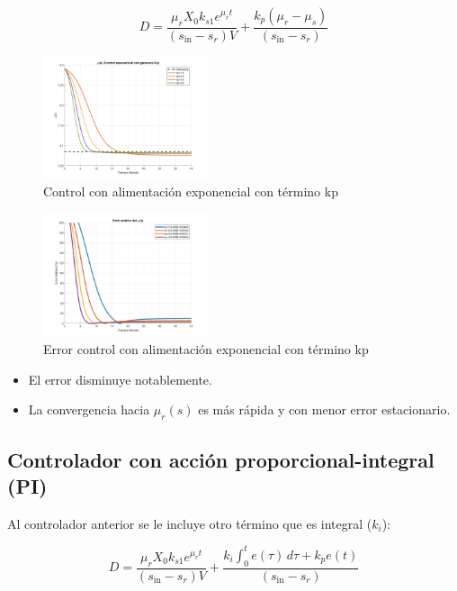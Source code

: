 \documentclass[letterpaper, 10 pt, conference]{ieeeconf}  %
\begin{document}
\begin{equation}
D = \frac{\mu_r X_0 k_{s1} e^{\mu_r t}}{(s_{\text{in}} - s_r) V} + \frac{k_p (\mu_r - \mu_s)}{(s_{\text{in}} - s_r)}
\end{equation}

\begin{figure}[H]
  \centering
  \includegraphics[width=0.43\textwidth]{./Images_tp3/exp_kp.png}
  \caption{Control con alimentación exponencial con término kp}
\end{figure}
\begin{figure}[H]
  \centering
  \includegraphics[width=0.43\textwidth]{./Images_tp3/exp_err_kp.png}
  \caption{Error control con alimentación exponencial con término kp}
\end{figure}

\begin{itemize}  
    \item El error disminuye notablemente.  
    \item La convergencia hacia \(\mu_r(s)\) es más rápida y con menor error estacionario.  
\end{itemize}  

\subsection{Controlador con acción proporcional-integral (PI)}  
Al controlador anterior se le incluye otro término que es integral (\(k_i\)):

\begin{equation}
D = \frac{\mu_r X_0 k_{s1} e^{\mu_r t}}{(s_{\text{in}} - s_r) V} + \frac{k_i \int_{0}^{t} e(\tau) \, d\tau + k_p e(t)}{(s_{\text{in}} - s_r)}
\end{equation}
\end{document}
